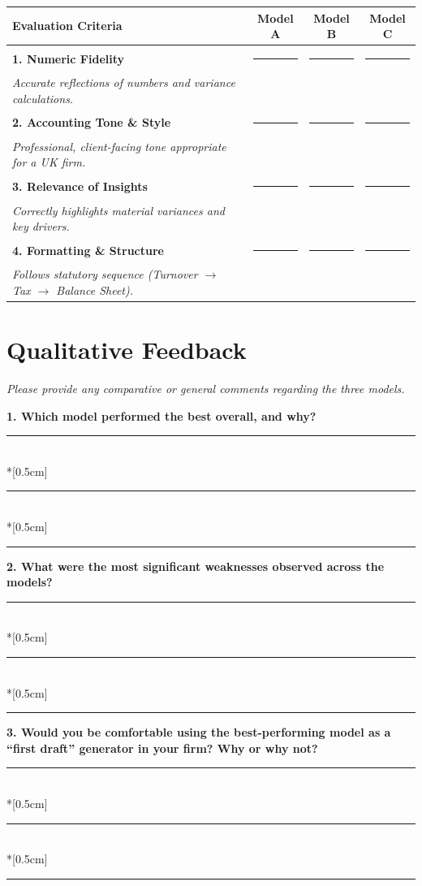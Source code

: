 \documentclass[12pt,a4paper]{article}
\begin{document}
\vspace{0.5cm}
\noindent
\renewcommand{\arraystretch}{1.5}
\begin{tabularx}{\textwidth}{X c c c}
\toprule
\textbf{Evaluation Criteria} & \textbf{Model A} & \textbf{Model B} & \textbf{Model C} \\
\midrule
\textbf{1. Numeric Fidelity} & \rule{1.5cm}{0.4pt} & \rule{1.5cm}{0.4pt} & \rule{1.5cm}{0.4pt} \\
\textit{\small Accurate reflections of numbers and variance calculations.} & & & \\
\addlinespace
\textbf{2. Accounting Tone \& Style} & \rule{1.5cm}{0.4pt} & \rule{1.5cm}{0.4pt} & \rule{1.5cm}{0.4pt} \\
\textit{\small Professional, client-facing tone appropriate for a UK firm.} & & & \\
\addlinespace
\textbf{3. Relevance of Insights} & \rule{1.5cm}{0.4pt} & \rule{1.5cm}{0.4pt} & \rule{1.5cm}{0.4pt} \\
\textit{\small Correctly highlights material variances and key drivers.} & & & \\
\addlinespace
\textbf{4. Formatting \& Structure} & \rule{1.5cm}{0.4pt} & \rule{1.5cm}{0.4pt} & \rule{1.5cm}{0.4pt} \\
\textit{\small Follows statutory sequence (Turnover $\rightarrow$ Tax $\rightarrow$ Balance Sheet).} & & & \\
\bottomrule
\end{tabularx}
\renewcommand{\arraystretch}{1.0}

\vspace{1cm}
\section*{Qualitative Feedback}
\textit{Please provide any comparative or general comments regarding the three models.}

\vspace{0.5cm}
\noindent \textbf{1. Which model performed the best overall, and why?}
\vspace{0.2cm}\\
\noindent\rule{\textwidth}{0.4pt} \\*[0.5cm]
\noindent\rule{\textwidth}{0.4pt} \\*[0.5cm]
\noindent\rule{\textwidth}{0.4pt}

\vspace{0.5cm}
\noindent \textbf{2. What were the most significant weaknesses observed across the models?}
\vspace{0.2cm}\\
\noindent\rule{\textwidth}{0.4pt} \\*[0.5cm]
\noindent\rule{\textwidth}{0.4pt} \\*[0.5cm]
\noindent\rule{\textwidth}{0.4pt}

\vspace{0.5cm}
\noindent \textbf{3. Would you be comfortable using the best-performing model as a ``first draft'' generator in your firm? Why or why not?}
\vspace{0.2cm}\\
\noindent\rule{\textwidth}{0.4pt} \\*[0.5cm]
\noindent\rule{\textwidth}{0.4pt} \\*[0.5cm]
\noindent\rule{\textwidth}{0.4pt}
\end{document}
